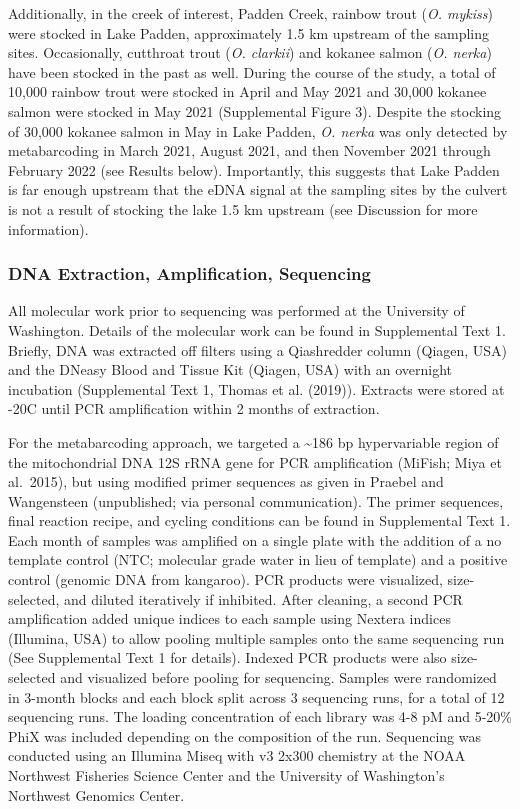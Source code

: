 \documentclass[
]{article}
\begin{document}
Additionally, in the creek of interest, Padden Creek, rainbow trout
(\emph{O. mykiss}) were stocked in Lake Padden, approximately 1.5 km
upstream of the sampling sites. Occasionally, cutthroat trout (\emph{O.
clarkii}) and kokanee salmon (\emph{O. nerka}) have been stocked in the
past as well. During the course of the study, a total of 10,000 rainbow
trout were stocked in April and May 2021 and 30,000 kokanee salmon were
stocked in May 2021 (Supplemental Figure 3). Despite the stocking of
30,000 kokanee salmon in May in Lake Padden, \emph{O. nerka} was only
detected by metabarcoding in March 2021, August 2021, and then November
2021 through February 2022 (see Results below). Importantly, this
suggests that Lake Padden is far enough upstream that the eDNA signal at
the sampling sites by the culvert is not a result of stocking the lake
1.5 km upstream (see Discussion for more information).

\hypertarget{dna-extraction-amplification-sequencing}{%
\subsubsection{DNA Extraction, Amplification,
Sequencing}\label{dna-extraction-amplification-sequencing}}

All molecular work prior to sequencing was performed at the University
of Washington. Details of the molecular work can be found in
Supplemental Text 1. Briefly, DNA was extracted off filters using a
Qiashredder column (Qiagen, USA) and the DNeasy Blood and Tissue Kit
(Qiagen, USA) with an overnight incubation (Supplemental Text 1, Thomas
et al. (2019)). Extracts were stored at -20\degree C until PCR
amplification within 2 months of extraction.

For the metabarcoding approach, we targeted a \textasciitilde186 bp
hypervariable region of the mitochondrial DNA 12S rRNA gene for PCR
amplification (MiFish; Miya et al.~2015), but using modified primer
sequences as given in Praebel and Wangensteen (unpublished; via personal
communication). The primer sequences, final reaction recipe, and cycling
conditions can be found in Supplemental Text 1. Each month of samples
was amplified on a single plate with the addition of a no template
control (NTC; molecular grade water in lieu of template) and a positive
control (genomic DNA from kangaroo). PCR products were visualized,
size-selected, and diluted iteratively if inhibited. After cleaning, a
second PCR amplification added unique indices to each sample using
Nextera indices (Illumina, USA) to allow pooling multiple samples onto
the same sequencing run (See Supplemental Text 1 for details). Indexed
PCR products were also size-selected and visualized before pooling for
sequencing. Samples were randomized in 3-month blocks and each block
split across 3 sequencing runs, for a total of 12 sequencing runs. The
loading concentration of each library was 4-8 pM and 5-20\% PhiX was
included depending on the composition of the run. Sequencing was
conducted using an Illumina Miseq with v3 2x300 chemistry at the NOAA
Northwest Fisheries Science Center and the University of Washington's
Northwest Genomics Center.
\end{document}
